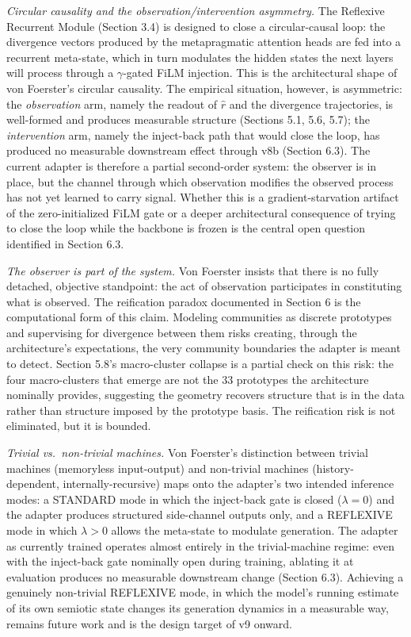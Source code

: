 \documentclass[
  11pt]{article}
\begin{document}
\emph{Circular causality and the observation/intervention asymmetry.}
The Reflexive Recurrent Module (Section 3.4) is designed to close a
circular-causal loop: the divergence vectors produced by the
metapragmatic attention heads are fed into a recurrent meta-state, which
in turn modulates the hidden states the next layers will process through
a \(\gamma\)-gated FiLM injection. This is the architectural shape of
von Foerster's circular causality. The empirical situation, however, is
asymmetric: the \emph{observation} arm, namely the readout of
\(\hat{r}\) and the divergence trajectories, is well-formed and produces
measurable structure (Sections 5.1, 5.6, 5.7); the \emph{intervention}
arm, namely the inject-back path that would close the loop, has produced
no measurable downstream effect through v8b (Section 6.3). The current
adapter is therefore a partial second-order system: the observer is in
place, but the channel through which observation modifies the observed
process has not yet learned to carry signal. Whether this is a
gradient-starvation artifact of the zero-initialized FiLM gate or a
deeper architectural consequence of trying to close the loop while the
backbone is frozen is the central open question identified in Section
6.3.

\emph{The observer is part of the system.} Von Foerster insists that
there is no fully detached, objective standpoint: the act of observation
participates in constituting what is observed. The reification paradox
documented in Section 6 is the computational form of this claim.
Modeling communities as discrete prototypes and supervising for
divergence between them risks creating, through the architecture's
expectations, the very community boundaries the adapter is meant to
detect. Section 5.8's macro-cluster collapse is a partial check on this
risk: the four macro-clusters that emerge are not the 33 prototypes the
architecture nominally provides, suggesting the geometry recovers
structure that is in the data rather than structure imposed by the
prototype basis. The reification risk is not eliminated, but it is
bounded.

\emph{Trivial vs.~non-trivial machines.} Von Foerster's distinction
between trivial machines (memoryless input-output) and non-trivial
machines (history-dependent, internally-recursive) maps onto the
adapter's two intended inference modes: a STANDARD mode in which the
inject-back gate is closed (\(\lambda = 0\)) and the adapter produces
structured side-channel outputs only, and a REFLEXIVE mode in which
\(\lambda > 0\) allows the meta-state to modulate generation. The
adapter as currently trained operates almost entirely in the
trivial-machine regime: even with the inject-back gate nominally open
during training, ablating it at evaluation produces no measurable
downstream change (Section 6.3). Achieving a genuinely non-trivial
REFLEXIVE mode, in which the model's running estimate of its own
semiotic state changes its generation dynamics in a measurable way,
remains future work and is the design target of v9 onward.
\end{document}
